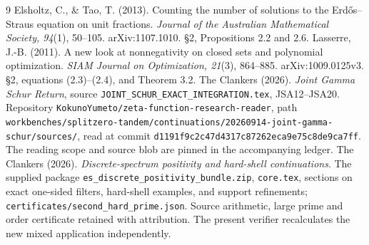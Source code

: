 \begin{thebibliography}{9}
 Elsholtz, C., \& Tao, T. (2013).
Counting the number of solutions to the Erd\H{o}s--Straus equation on unit fractions.
\emph{Journal of the Australian Mathematical Society, 94}(1), 50--105.
arXiv:1107.1010. \S2, Propositions 2.2 and 2.6.
 Lasserre, J.-B. (2011).
A new look at nonnegativity on closed sets and polynomial optimization.
\emph{SIAM Journal on Optimization, 21}(3), 864--885.
arXiv:1009.0125v3. \S2, equations (2.3)--(2.4), and Theorem 3.2.
 The Clankers (2026).
\emph{Joint Gamma Schur Return}, source
\texttt{JOINT\_SCHUR\_EXACT\_INTEGRATION.tex}, JSA12--JSA20.
Repository \texttt{KokunoYumeto/zeta-function-research-reader}, path
\texttt{workbenches/splitzero-tandem/continuations/20260914-joint-gamma-schur/sources/},
read at commit \texttt{d1191f9c2c47d4317c87262eca9e75c8de9ca7ff}.
The reading scope and source blob are pinned in the accompanying ledger.
 The Clankers (2026).
\emph{Discrete-spectrum positivity and hard-shell continuations}.
The supplied package \texttt{es\_discrete\_positivity\_bundle.zip},
\texttt{core.tex}, sections on exact one-sided filters, hard-shell examples,
and support refinements; \texttt{certificates/second\_hard\_prime.json}.
Source arithmetic, large prime and order certificate retained with attribution.
The present verifier recalculates the new mixed application independently.
\end{thebibliography}
